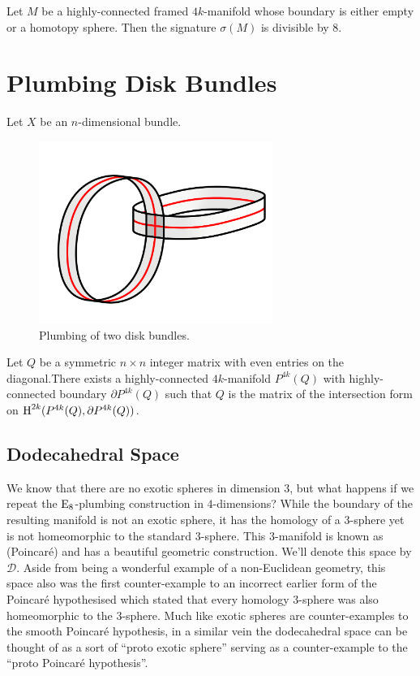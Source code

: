 \begin{theorem}\label{thm:signature_divisible_by_8}
	Let $M$ be a highly-connected framed $4k$-manifold whose boundary is either empty or a homotopy sphere. Then the signature $\sigma(M)$ is divisible by $8$.
\end{theorem}

\section{Plumbing Disk Bundles}

Let $X$ be an $n$-dimensional bundle.


\begin{figure}[ht]
	\centering
	\includegraphics[width=3in]{graphics/temp-diagrams/disk-bundle-plumbing-example.png}
	\caption{Plumbing of two disk bundles.}\label{fig:disk-bundle-plumbing-example}
\end{figure}

\begin{theorem}
	Let $Q$ be a symmetric $n\times n$ integer matrix with even entries on the diagonal.There exists a highly-connected $4k$-manifold $P^{4k}(Q)$ with highly-connected boundary $\partial P^{4k}(Q)$ such that $Q$ is the matrix of the intersection form on $\operatorname{H}^{2k}(P^{4k}(Q), \partial P^{4k}(Q))$.
\end{theorem}

\pagebreak
\subsection*{Dodecahedral Space}

We know that there are no exotic spheres in dimension $3$, but what happens if we repeat the ${\operatorname{E}}_8$-plumbing construction in $4$-dimensions? While the boundary of the resulting manifold is not an exotic sphere, it has the homology of a $3$-sphere yet is not homeomorphic to the standard $3$-sphere.
This $3$-manifold is known as (Poincar\'e)  and has a beautiful geometric construction. We'll denote this space by $\mathscr{D}$. Aside from being a wonderful example of a non-Euclidean geometry, this space also was the first counter-example to an incorrect earlier form of the Poincar\'e hypothesised which stated that every homology $3$-sphere was also homeomorphic to the $3$-sphere. Much like exotic spheres are counter-examples to the smooth Poincar\'e hypothesis, in a similar vein the dodecahedral space can be thought of as a sort of ``proto exotic sphere'' serving as a counter-example to the ``proto Poincar\'e hypothesis''.

